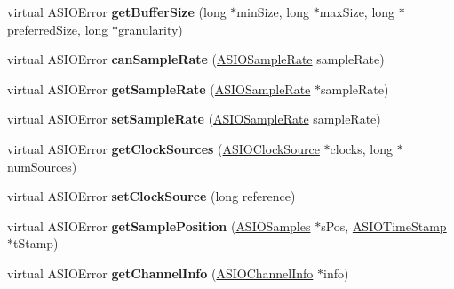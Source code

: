 \begin{DoxyCompactItemize}
\item 
virtual A\+S\+I\+O\+Error {\bfseries get\+Buffer\+Size} (long $\ast$min\+Size, long $\ast$max\+Size, long $\ast$preferred\+Size, long $\ast$granularity)\hypertarget{class_asio_driver_ac5bc5e680b56bd2288b48dbf88ae7f69}{}\label{class_asio_driver_ac5bc5e680b56bd2288b48dbf88ae7f69}

\item 
virtual A\+S\+I\+O\+Error {\bfseries can\+Sample\+Rate} (\hyperlink{struct_a_s_i_o_sample_rate}{A\+S\+I\+O\+Sample\+Rate} sample\+Rate)\hypertarget{class_asio_driver_a19fa9e98c64382dab3f9cfe578dba53c}{}\label{class_asio_driver_a19fa9e98c64382dab3f9cfe578dba53c}

\item 
virtual A\+S\+I\+O\+Error {\bfseries get\+Sample\+Rate} (\hyperlink{struct_a_s_i_o_sample_rate}{A\+S\+I\+O\+Sample\+Rate} $\ast$sample\+Rate)\hypertarget{class_asio_driver_a1dd82d786ae89f2cff4d1ad20d4fb932}{}\label{class_asio_driver_a1dd82d786ae89f2cff4d1ad20d4fb932}

\item 
virtual A\+S\+I\+O\+Error {\bfseries set\+Sample\+Rate} (\hyperlink{struct_a_s_i_o_sample_rate}{A\+S\+I\+O\+Sample\+Rate} sample\+Rate)\hypertarget{class_asio_driver_a3dd65f5c530e5b556229f7a533f479c8}{}\label{class_asio_driver_a3dd65f5c530e5b556229f7a533f479c8}

\item 
virtual A\+S\+I\+O\+Error {\bfseries get\+Clock\+Sources} (\hyperlink{struct_a_s_i_o_clock_source}{A\+S\+I\+O\+Clock\+Source} $\ast$clocks, long $\ast$num\+Sources)\hypertarget{class_asio_driver_aebe7500bdcae24dde15a3e46ca46e67f}{}\label{class_asio_driver_aebe7500bdcae24dde15a3e46ca46e67f}

\item 
virtual A\+S\+I\+O\+Error {\bfseries set\+Clock\+Source} (long reference)\hypertarget{class_asio_driver_aef8f3b6ca6f3b518bc4ac93e768a106b}{}\label{class_asio_driver_aef8f3b6ca6f3b518bc4ac93e768a106b}

\item 
virtual A\+S\+I\+O\+Error {\bfseries get\+Sample\+Position} (\hyperlink{struct_a_s_i_o_samples}{A\+S\+I\+O\+Samples} $\ast$s\+Pos, \hyperlink{struct_a_s_i_o_time_stamp}{A\+S\+I\+O\+Time\+Stamp} $\ast$t\+Stamp)\hypertarget{class_asio_driver_ad62177586c77e0c3fa4d40d6dc1bfd46}{}\label{class_asio_driver_ad62177586c77e0c3fa4d40d6dc1bfd46}

\item 
virtual A\+S\+I\+O\+Error {\bfseries get\+Channel\+Info} (\hyperlink{struct_a_s_i_o_channel_info}{A\+S\+I\+O\+Channel\+Info} $\ast$info)\hypertarget{class_asio_driver_a268fae6d0183b11899257f855b46939b}{}\label{class_asio_driver_a268fae6d0183b11899257f855b46939b}


\end{DoxyCompactItemize}
